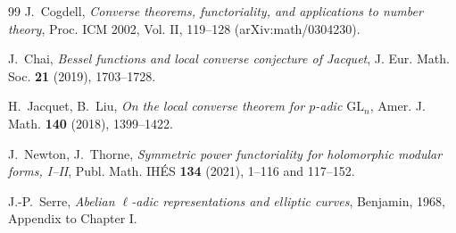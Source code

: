 \documentclass[11pt]{article}
\theoremstyle{definition}
\theoremstyle{remark}
\newcommand{\GL}{\mathrm{GL}}
\begin{document}
\begin{thebibliography}{99}
 J.~Cogdell,
\emph{Converse theorems, functoriality, and applications to number theory},
Proc. ICM 2002, Vol. II, 119--128 (arXiv:math/0304230).

 J.~Chai,
\emph{Bessel functions and local converse conjecture of Jacquet},
J. Eur. Math. Soc. \textbf{21} (2019), 1703--1728.

 H.~Jacquet, B.~Liu,
\emph{On the local converse theorem for $p$-adic $\GL_n$}, Amer. J. Math.
\textbf{140} (2018), 1399--1422.

 J.~Newton, J.~Thorne,
\emph{Symmetric power functoriality for holomorphic modular forms, I--II},
Publ. Math. IH\'ES \textbf{134} (2021), 1--116 and 117--152.

 J.-P.~Serre,
\emph{Abelian $\ell$-adic representations and elliptic curves}, Benjamin,
1968, Appendix to Chapter I.

\end{thebibliography}
\end{document}
